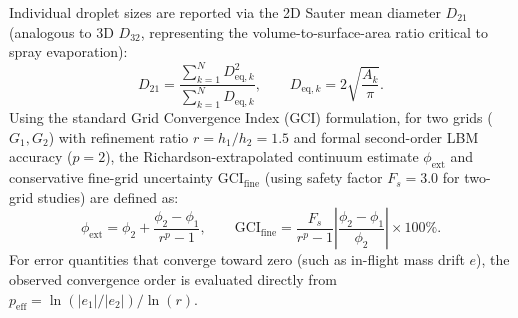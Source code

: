 \documentclass[11pt,a4paper]{article}
\begin{document}
Individual droplet sizes are reported via the 2D Sauter mean diameter $D_{21}$ (analogous to 3D $D_{32}$, representing the volume-to-surface-area ratio critical to spray evaporation):
\begin{equation}
    D_{21} = \frac{\sum_{k=1}^{N} D_{\mathrm{eq},k}^2}{\sum_{k=1}^{N} D_{\mathrm{eq},k}}, \qquad D_{\mathrm{eq},k} = 2\sqrt{\frac{A_k}{\pi}}.
\end{equation}
Using the standard Grid Convergence Index (GCI) formulation, for two grids ($G_1, G_2$) with refinement ratio $r = h_1/h_2 = 1.5$ and formal second-order LBM accuracy ($p = 2$), the Richardson-extrapolated continuum estimate $\phi_{\mathrm{ext}}$ and conservative fine-grid uncertainty $\mathrm{GCI}_{\mathrm{fine}}$ (using safety factor $F_s = 3.0$ for two-grid studies) are defined as:
\begin{equation}
    \phi_{\mathrm{ext}} = \phi_2 + \frac{\phi_2 - \phi_1}{r^p - 1}, \qquad \mathrm{GCI}_{\mathrm{fine}} = \frac{F_s}{r^p - 1} \left| \frac{\phi_2 - \phi_1}{\phi_2} \right| \times 100\%.
\end{equation}
For error quantities that converge toward zero (such as in-flight mass drift $e$), the observed convergence order is evaluated directly from $p_{\mathrm{eff}} = \ln(|e_1|/|e_2|) / \ln(r)$.

\end{document}

